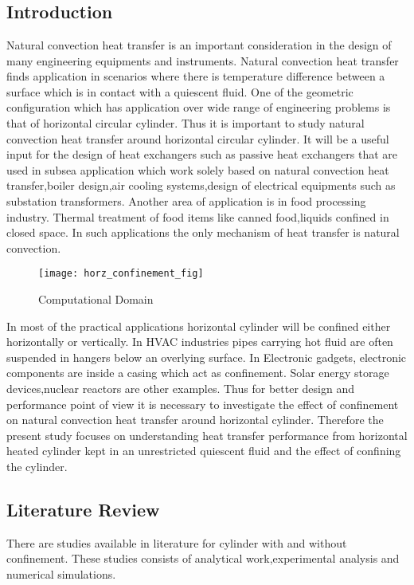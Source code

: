 \chapter{}

\section{Introduction}
\hspace{1cm}Natural convection heat transfer is an important consideration in the design of many engineering equipments and instruments. Natural convection heat transfer finds application in scenarios where there is  temperature difference between a surface which is in contact with a quiescent fluid. One of the geometric configuration which has application over wide range of engineering problems is that of horizontal circular cylinder. Thus it is important to study natural convection heat transfer around horizontal circular cylinder. It will be a useful input for the design of heat exchangers such as passive heat exchangers that are used in subsea  application which work solely based on natural convection heat transfer,boiler design,air cooling systems,design of electrical equipments such as substation transformers. Another area of application is in food processing industry. Thermal treatment of  food items like canned food,liquids confined in closed space. In such applications the only mechanism of heat transfer is natural convection.

\begin{figure}[h]
\centering
\texttt{[image: horz\_confinement\_fig]}
\caption{Computational Domain}
\label{fig:cd}
\end{figure}

In most of the practical applications horizontal cylinder will be confined either horizontally or vertically. In HVAC industries pipes carrying hot fluid are often suspended in hangers below an overlying surface. In Electronic gadgets, electronic components are inside a casing which act as confinement. Solar energy storage devices,nuclear reactors are other examples. Thus for better design and performance point of view it is necessary to investigate the effect of confinement on natural convection heat transfer around horizontal cylinder.  Therefore the present study focuses on understanding heat transfer performance from horizontal heated cylinder kept in an unrestricted quiescent fluid and the effect of confining the cylinder.
\section{Literature Review}
\hspace{0.5cm}There are studies available in literature for cylinder with and without confinement. These studies consists of analytical work,experimental analysis and numerical simulations.
